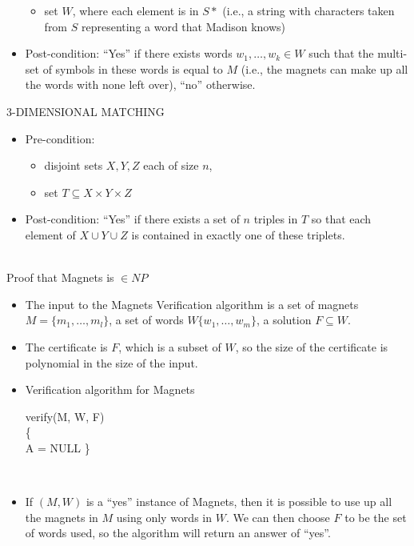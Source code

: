 \documentclass{assignment}
\begin{document}
\begin{problemlist}
\begin{problem}
\begin{itemize}
\begin{itemize}
\item set $W$, where each element is in $S*$ (i.e., a string with characters taken from $S$ representing a word that Madison knows)
\end{itemize}
\item Post-condition: ``Yes'' if there exists words $w_1,\ldots,w_k\in W$ such that the multi-set of symbols in these words is equal to $M$ (i.e., the magnets can make up all the words with none left over), ``no'' otherwise.
\end{itemize}
3-DIMENSIONAL MATCHING
\begin{itemize}
\item Pre-condition:
\begin{itemize}
\item disjoint sets $X,Y,Z$ each of size $n$,
\item set $T\subseteq X\times Y\times Z$
\end{itemize}
\item Post-condition: ``Yes'' if there exists a set of $n$ triples in $T$ so that each element of $X\cup Y\cup Z$ is contained in exactly one of these triplets.
\end{itemize}
\end{problem}
\begin{answer}
\\
Proof that Magnets is $\in NP$\\
\begin{itemize}
\item The input to the Magnets Verification algorithm is a set of magnets $M=\{m_1,\ldots,m_l\}$, a set of words $W\{w_1,\ldots,w_m\}$, a solution $F\subseteq W$.
\item The certificate is $F$, which is a subset of $W$, so the size of the certificate is polynomial in the size of the input.
\item Verification algorithm for Magnets
\IncMargin{3em}
\begin{algorithm}
  verify(M, W, F)\\\{\\
  \Indp
  A = NULL\;
  \Indm
  \}
\end{algorithm}
\DecMargin{3em}\\
\item If $(M, W)$ is a ``yes'' instance of Magnets, then it is possible to use up all the magnets in $M$ using only words in $W$. We can then choose $F$ to be the set of words used, so the algorithm will return an answer of ``yes''.\\

\end{itemize}
\end{answer}
\end{problemlist}
\end{document}
